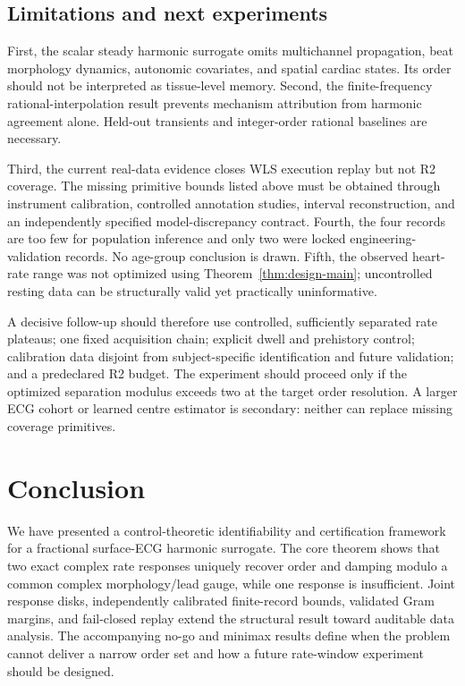 \documentclass[11pt]{article}
\theoremstyle{definition}
\theoremstyle{remark}
\begin{document}
\subsection{Limitations and next experiments}

First, the scalar steady harmonic surrogate omits multichannel propagation,
beat morphology dynamics, autonomic covariates, and spatial cardiac states.
Its order should not be interpreted as tissue-level memory.  Second, the
finite-frequency rational-interpolation result prevents mechanism attribution
from harmonic agreement alone.  Held-out transients and integer-order
rational baselines are necessary.

Third, the current real-data evidence closes WLS execution replay but not R2
coverage.  The missing primitive bounds listed above must be obtained through
instrument calibration, controlled annotation studies, interval
reconstruction, and an independently specified model-discrepancy contract.
Fourth, the four records are too few for population inference and only two
were locked engineering-validation records.  No age-group conclusion is
drawn.  Fifth, the observed heart-rate range was not optimized using
Theorem~\ref{thm:design-main}; uncontrolled resting data can be structurally
valid yet practically uninformative.

A decisive follow-up should therefore use controlled, sufficiently separated
rate plateaus; one fixed acquisition chain; explicit dwell and prehistory
control; calibration data disjoint from subject-specific identification and
future validation; and a predeclared R2 budget.  The experiment should proceed
only if the optimized separation modulus exceeds two at the target order
resolution.  A larger ECG cohort or learned centre estimator is secondary:
neither can replace missing coverage primitives.

\section{Conclusion}

We have presented a control-theoretic identifiability and certification
framework for a fractional surface-ECG harmonic surrogate.  The core theorem
shows that two exact complex rate responses uniquely recover order and damping
modulo a common complex morphology/lead gauge, while one response is
insufficient.  Joint response disks, independently calibrated finite-record
bounds, validated Gram margins, and fail-closed replay extend the structural
result toward auditable data analysis.  The accompanying no-go and minimax
results define when the problem cannot deliver a narrow order set and how a
future rate-window experiment should be designed.
\end{document}

